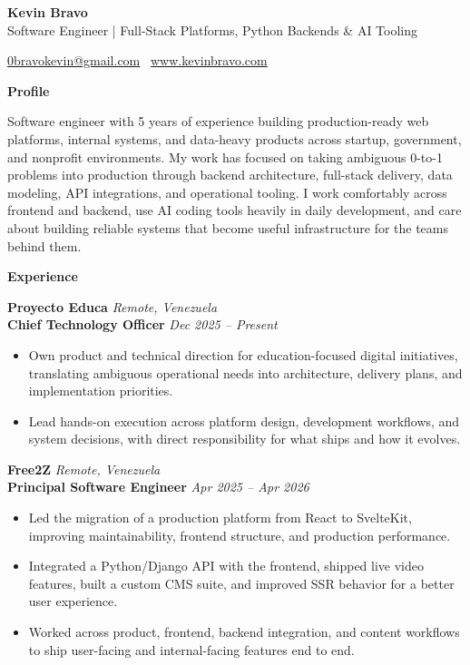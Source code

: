\documentclass[11pt]{article}
\begin{document}
\begin{center}
    {\LARGE \textbf{Kevin Bravo}}\\
    Software Engineer | Full-Stack Platforms, Python Backends \& AI Tooling \\
    \hrulefill
\end{center}
\begin{center}
    \href{mailto:0bravokevin@gmail.com}{0bravokevin@gmail.com}
    \textbullet\ 
    \href{http://www.kevinbravo.com}{www.kevinbravo.com}
\end{center}
\vspace{4pt}
\begin{center}
    \textbf{Profile}
\end{center}
\vspace{-4pt}
Software engineer with 5 years of experience building production-ready web platforms, internal systems, and data-heavy products across startup, government, and nonprofit environments. My work has focused on taking ambiguous 0-to-1 problems into production through backend architecture, full-stack delivery, data modeling, API integrations, and operational tooling. I work comfortably across frontend and backend, use AI coding tools heavily in daily development, and care about building reliable systems that become useful infrastructure for the teams behind them.
\vspace{8pt}
\begin{center}
    \textbf{Experience}
\end{center}
\vspace{-4pt}
\textbf{Proyecto Educa} \hfill \textit{Remote, Venezuela} \\
\textbf{Chief Technology Officer} \hfill \textit{Dec 2025 -- Present}
\begin{itemize}
    \item Own product and technical direction for education-focused digital initiatives, translating ambiguous operational needs into architecture, delivery plans, and implementation priorities.
    \item Lead hands-on execution across platform design, development workflows, and system decisions, with direct responsibility for what ships and how it evolves.
\end{itemize}
\vspace{10pt}
\textbf{Free2Z} \hfill \textit{Remote, Venezuela} \\
\textbf{Principal Software Engineer} \hfill \textit{Apr 2025 -- Apr 2026}
\begin{itemize}
    \item Led the migration of a production platform from React to SvelteKit, improving maintainability, frontend structure, and production performance.
    \item Integrated a Python/Django API with the frontend, shipped live video features, built a custom CMS suite, and improved SSR behavior for a better user experience.
    \item Worked across product, frontend, backend integration, and content workflows to ship user-facing and internal-facing features end to end.
\end{itemize}
\end{document}
